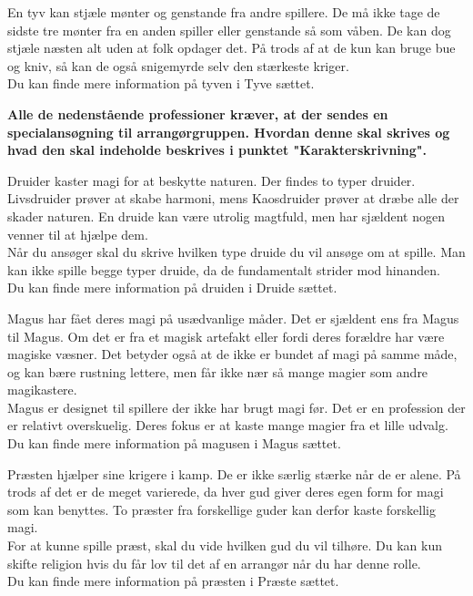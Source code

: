 \begin{prof*}[Tyv]
En tyv kan stjæle mønter og genstande fra andre spillere. De må ikke tage de sidste tre mønter fra en anden spiller eller genstande så som våben. De kan dog stjæle næsten alt uden at folk opdager det. På trods af at de kun kan bruge bue og kniv, så kan de også snigemyrde selv den stærkeste kriger.\\
Du kan finde mere information på tyven i Tyve sættet.
\end{prof*}

{\large \textbf{Alle de nedenstående professioner kræver, at der sendes en specialansøgning til arrangørgruppen. Hvordan denne skal skrives og hvad den skal indeholde beskrives i punktet "Karakterskrivning".}}

\begin{prof*}
Druider kaster magi for at beskytte naturen. Der findes to typer druider. Livsdruider prøver at skabe harmoni, mens Kaosdruider prøver at dræbe alle der skader naturen. En druide kan være utrolig magtfuld, men har sjældent nogen venner til at hjælpe dem.\\
Når du ansøger skal du skrive hvilken type druide du vil ansøge om at spille. Man kan ikke spille begge typer druide, da de fundamentalt strider mod hinanden.\\
Du kan finde mere information på druiden i Druide sættet.
\end{prof*}

\begin{prof*}
Magus har fået deres magi på usædvanlige måder. Det er sjældent ens fra Magus til Magus. Om det er fra et magisk artefakt eller fordi deres forældre har være magiske væsner. Det betyder også at de ikke er bundet af magi på samme måde, og kan bære rustning lettere, men får ikke nær så mange magier som andre magikastere.\\
Magus er designet til spillere der ikke har brugt magi før. Det er en profession der er relativt overskuelig. Deres fokus er at kaste mange magier fra et lille udvalg.\\
Du kan finde mere information på magusen i Magus sættet.
\end{prof*}

\begin{prof*}
Præsten hjælper sine krigere i kamp. De er ikke særlig stærke når de er alene. På trods af det er de meget varierede, da hver gud giver deres egen form for magi som kan benyttes. To præster fra forskellige guder kan derfor kaste forskellig magi.\\
For at kunne spille præst, skal du vide hvilken gud du vil tilhøre. Du kan kun skifte religion hvis du får lov til det af en arrangør når du har denne rolle.\\
Du kan finde mere information på præsten i Præste sættet.
\end{prof*}

